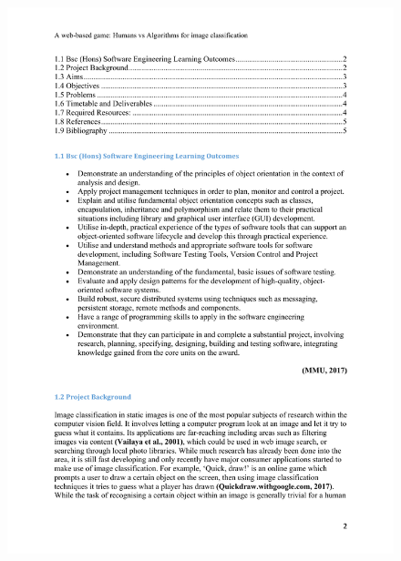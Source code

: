 \documentclass[a4paper,12pt]{report}
\begin{document}
\begin{appendices}
    \begin{figure}[h]
      \centering
      \includegraphics[scale=0.8]{tor-2}
    \end{figure}


\end{appendices}
\end{document}
